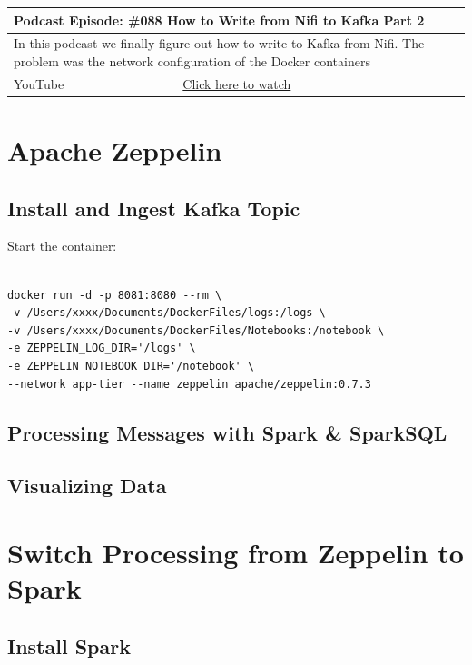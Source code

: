\documentclass[12pt, numbers=noenddot]{scrreprt} %
\begin{document}
\begin{table}[h]
\begin{tabular}{ll}
\hline
\multicolumn{2}{l}{\textbf{Podcast Episode:} \#088 How to Write from Nifi to Kafka Part 2} \\ \hline
\multicolumn{2}{p{15cm}}{In this podcast we finally figure out how to write to Kafka from Nifi. The problem was the network configuration of the Docker containers}         \\ \hline
\multicolumn{1}{l|}{YouTube}   & \href{https://youtu.be/pJbRnBQmoCs}{Click here to watch}   \\ \hline
\end{tabular}
\end{table}


\chapter{Apache Zeppelin}

\section{Install and Ingest Kafka Topic}

Start the container:
\begin{lstlisting}

docker run -d -p 8081:8080 --rm \
-v /Users/xxxx/Documents/DockerFiles/logs:/logs \ 
-v /Users/xxxx/Documents/DockerFiles/Notebooks:/notebook \
-e ZEPPELIN_LOG_DIR='/logs' \
-e ZEPPELIN_NOTEBOOK_DIR='/notebook' \
--network app-tier --name zeppelin apache/zeppelin:0.7.3
\end{lstlisting}

\section{Processing Messages with Spark \& SparkSQL}

\section{Visualizing Data}


\chapter{Switch Processing from Zeppelin to Spark}

\section{Install Spark}
\end{document}
